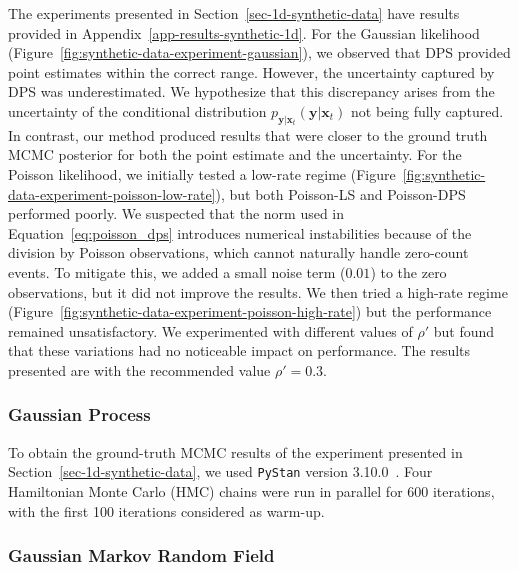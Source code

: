 The experiments presented in Section~\ref{sec-1d-synthetic-data} have results provided in Appendix~\ref{app-results-synthetic-1d}. For the Gaussian likelihood (Figure~\ref{fig:synthetic-data-experiment-gaussian}), we observed that DPS provided point estimates within the correct range. However, the uncertainty captured by DPS was underestimated. We hypothesize that this discrepancy arises from the uncertainty of the conditional distribution $p_{ \mathbf{y} \vert  \mathbf{x}_t}(\mathbf{y} \vert  \mathbf{x}_t)$ not being fully captured. In contrast, our method produced results that were closer to the ground truth MCMC posterior for both the point estimate and the uncertainty.
For the Poisson likelihood, we initially tested a low-rate regime (Figure~\ref{fig:synthetic-data-experiment-poisson-low-rate}), but both Poisson-LS and Poisson-DPS performed poorly. We suspected that the norm used in Equation~\eqref{eq:poisson_dps} introduces numerical instabilities because of the division by Poisson observations, which cannot naturally handle zero-count events. To mitigate this, we added a small noise term ($0.01$) to the zero observations, but it did not improve the results. We then tried a high-rate regime (Figure~\ref{fig:synthetic-data-experiment-poisson-high-rate}) but the performance remained unsatisfactory. 
We experimented with different values of $\rho'$ but found that these variations had no noticeable impact on performance. The results presented are with the recommended value $\rho' = 0.3$.
  
\subsubsection{Gaussian Process}
To obtain the ground-truth MCMC results of the experiment presented in Section~\ref{sec-1d-synthetic-data}, we used \texttt{PyStan} version 3.10.0~\citep{pystan}. Four Hamiltonian Monte Carlo (HMC) chains were run in parallel for 600 iterations, with the first 100 iterations considered as warm-up. 






\subsubsection{Gaussian Markov Random Field}

